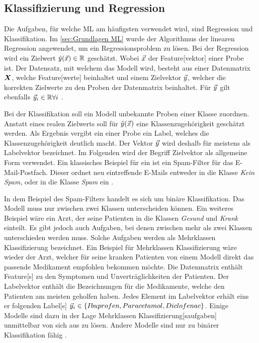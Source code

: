 \subsection{Klassifizierung und Regression} \label{sec:ML klass und Reg}
Die Aufgaben, für welche \gls{ML} am häufigsten verwendet wird, sind Regression und \gls{Klassifikation}. Im \autoref{sec:Grundlagen ML} wurde der Algorithmus der linearen Regression angewendet, um ein Regressionsproblem zu lösen. Bei der Regression wird ein Zielwert \(\hat{y}(\vec{x}) \in \mathbb{R}\) geschätzt. Wobei \(\vec{x}\) der \gls{Feature}[vektor] einer Probe ist. Der Datensatz, mit welchem das Modell  wird, besteht aus einer \gls{Datenmatrix} \(\boldsymbol{X}\), welche \gls{Feature}[werte] beinhaltet und einem \gls{Zielvektor} \(\vec{y}\), welcher die korrekten Zielwerte zu den Proben der \gls{Datenmatrix} beinhaltet. Für \(\vec{y}\) gilt ebenfalls \(\vec{y}_i \in \mathbb{R} \forall i \) \cite{Burkov.2019, ShalevShwartz.2014}. \par

Bei der \gls{Klassifikation} soll ein Modell unbekannte Proben einer Klasse zuordnen. Anstatt eines realen Zielwerts soll für \(\hat{y}(\vec{x})\) eine Klassenzugehörigkeit geschätzt werden. Als Ergebnis vergibt ein  einer Probe ein \gls{Label}, welches die Klassenzugehörigkeit deutlich macht. Der Vektor \(\vec{y}\) wird deshalb für  meistens als \gls{Labelvektor} bezeichnet. Im Folgenden wird der Begriff \gls{Zielvektor} als allgemeine Form verwendet. Ein klassisches Beispiel für ein  ist ein Spam-Filter für das E-Mail-Postfach. Dieser ordnet neu eintreffende E-Mails entweder in die Klasse \textit{Kein Spam}, oder in die Klasse \textit{Spam} ein \cite{Burkov.2019}. \par

In dem Beispiel des Spam-Filters handelt es sich um binäre \gls{Klassifikation}. Das Modell muss nur zwischen zwei Klassen unterscheiden können. Ein weiteres Beispiel wäre ein Arzt, der seine Patienten in die Klassen \textit{Gesund} und \textit{Krank} einteilt. Es gibt jedoch auch Aufgaben, bei denen zwischen mehr als zwei Klassen unterschieden werden muss. Solche Aufgaben werden als \gls{Mehrklassen Klassifizierung} bezeichnet. Ein Beispiel für \gls{Mehrklassen Klassifizierung} wäre wieder der Arzt, welcher für seine kranken Patienten von einem Modell direkt das passende Medikament empfohlen bekommen möchte. Die \gls{Datenmatrix} enthält \gls{Feature}[s] zu den Symptomen und Unverträglichkeiten der Patienten. Der \gls{Labelvektor} enthält die Bezeichnungen für die Medikamente, welche den Patienten am meisten geholfen haben. Jedes Element im \gls{Labelvektor} erhält eins er folgenden \gls{Label}[s] \(\vec{y}_i \in \{Ibuprofen, Paracetamol, Diclofenac\}\). Einige Modelle sind dazu in der Lage \gls{Mehrklassen Klassifizierung}[saufgaben] unmittelbar von sich aus zu lösen. Andere Modelle sind nur zu binärer \gls{Klassifikation} fähig \cite{Burkov.2019}.\par

